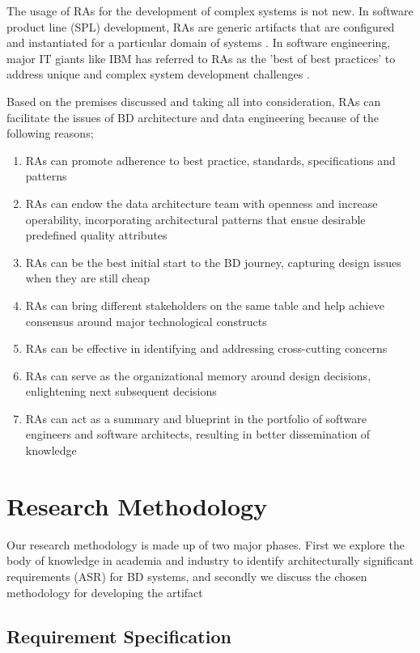 \documentclass[review]{elsarticle}
\begin{document}
The usage of RAs for the development of complex systems is not new. In software product line (SPL) development, RAs are generic artifacts that are configured and instantiated for a particular domain of systems \cite{Derras}. In software engineering, major IT giants like IBM has referred to RAs as the 'best of best practices' to address unique and complex system development challenges \cite{Cloutier}.

Based on the premises discussed and taking all into consideration, RAs can facilitate the issues of BD architecture and data engineering because of the following reasons;

\begin{enumerate}
    \item RAs can promote adherence to best practice, standards, specifications and patterns
    \item RAs can endow the data architecture team with openness and increase operability, incorporating architectural patterns that ensue desirable predefined quality attributes
    \item RAs can be the best initial start to the BD journey, capturing design issues when they are still cheap
    \item RAs can bring different stakeholders on the same table and help achieve consensus around major technological constructs
    \item RAs can be effective in identifying and addressing cross-cutting concerns
    \item RAs can serve as the organizational memory around design decisions, enlightening next subsequent decisions
    \item RAs can act as a summary and blueprint in the portfolio of software engineers and software architects, resulting in better dissemination of knowledge
\end{enumerate}

\section{Research Methodology}

Our research methodology is made up of two major phases. First we explore the body of knowledge in academia and industry to identify architecturally significant requirements (ASR) for BD systems, and secondly we discuss the chosen methodology for developing the artifact


\subsection{Requirement Specification}
\end{document}
